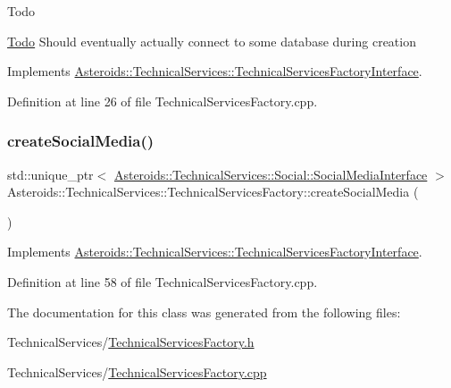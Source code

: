 \begin{DoxyRefDesc}{Todo}
\item[\hyperlink{todo__todo000020}{Todo}]Should eventually actually connect to some database during creation \end{DoxyRefDesc}


Implements \hyperlink{classAsteroids_1_1TechnicalServices_1_1TechnicalServicesFactoryInterface_a0c292d2c4cd79ae168acbdd791a14b3c}{Asteroids\+::\+Technical\+Services\+::\+Technical\+Services\+Factory\+Interface}.



Definition at line 26 of file Technical\+Services\+Factory.\+cpp.

\mbox{\label{classAsteroids_1_1TechnicalServices_1_1TechnicalServicesFactory_a26508a6297b0bbcb92370e597bb5fd15}} 
\subsubsection{\texorpdfstring{create\+Social\+Media()}{createSocialMedia()}}
{\footnotesize\ttfamily std\+::unique\+\_\+ptr$<$ \hyperlink{classAsteroids_1_1TechnicalServices_1_1Social_1_1SocialMediaInterface}{Asteroids\+::\+Technical\+Services\+::\+Social\+::\+Social\+Media\+Interface} $>$ Asteroids\+::\+Technical\+Services\+::\+Technical\+Services\+Factory\+::create\+Social\+Media (\begin{DoxyParamCaption}{ }\end{DoxyParamCaption})\hspace{0.3cm}{\ttfamily [virtual]}}



Implements \hyperlink{classAsteroids_1_1TechnicalServices_1_1TechnicalServicesFactoryInterface_a28196b5f4d7855fbc0d426a4004e857c}{Asteroids\+::\+Technical\+Services\+::\+Technical\+Services\+Factory\+Interface}.



Definition at line 58 of file Technical\+Services\+Factory.\+cpp.



The documentation for this class was generated from the following files\+:\begin{DoxyCompactItemize}
\item 
Technical\+Services/\hyperlink{TechnicalServicesFactory_8h}{Technical\+Services\+Factory.\+h}\item 
Technical\+Services/\hyperlink{TechnicalServicesFactory_8cpp}{Technical\+Services\+Factory.\+cpp}\end{DoxyCompactItemize}
